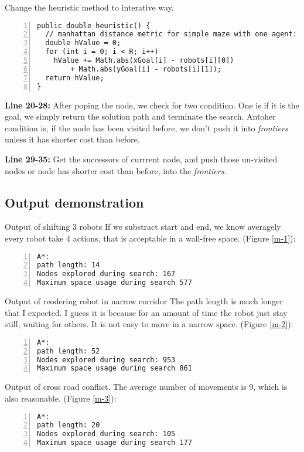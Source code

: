 \documentclass{article}
\begin{document}
Change the heuristic method to interative way.

\begin{lstlisting}[numbers=left]
public double heuristic() {
  // manhattan distance metric for simple maze with one agent:
  double hValue = 0;
  for (int i = 0; i < R; i++)
    hValue += Math.abs(xGoal[i] - robots[i][0])
        + Math.abs(yGoal[i] - robots[i][1]);
  return hValue;
}
\end{lstlisting}

\textbf{Line 20-28:} After poping the node, we check for two condition. One is if it is the goal, we simply return the solution path and terminate the search. Antoher condition is, if the node has been visited before, we don't push it into \emph{frontiers} unless it has shorter cost than before.

\textbf{Line 29-35:} Get the successors of currrent node, and push those un-visited nodes or node has shorter cost than before, into the \emph{frontiers}.



\subsection{Output demonstration}

Output of shifting 3 robots If we substract start and end, we know averagely every robot take 4 actions, that is acceptable in a wall-free space. (Figure \ref{m-1}):
\begin{lstlisting}[numbers=left]
A*:
path length: 14
Nodes explored during search: 167
Maximum space usage during search 577
\end{lstlisting}

Output of reodering robot in narrow corridor The path length is much longer that I expected. I guess it is because for an amount of time the robot just stay still, waiting for others. It is not easy to move in a narrow space. (Figure \ref{m-2}):
\begin{lstlisting}[numbers=left]
A*:
path length: 52
Nodes explored during search: 953
Maximum space usage during search 861
\end{lstlisting}


Output of cross road conflict. The average number of movements is 9, which is also reasonable. (Figure \ref{m-3}):
\begin{lstlisting}[numbers=left]
A*:
path length: 20
Nodes explored during search: 105
Maximum space usage during search 177
\end{lstlisting}
\end{document}
